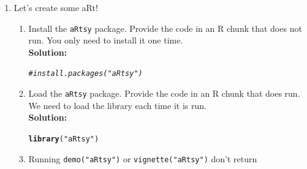 \documentclass{article}\usepackage[]{graphicx}\usepackage[]{xcolor}
\makeatletter
\newcommand{\hlsng}[1]{\textcolor[rgb]{0.192,0.494,0.8}{#1}}%
\newcommand{\hlcom}[1]{\textcolor[rgb]{0.678,0.584,0.686}{\textit{#1}}}%
\newcommand{\hldef}[1]{\textcolor[rgb]{0.345,0.345,0.345}{#1}}%
\newcommand{\hlkwd}[1]{\textcolor[rgb]{0.737,0.353,0.396}{\textbf{#1}}}%
\newenvironment{kframe}{%
 \def\at@end@of@kframe{}%
 \ifinner\ifhmode%
  \def\at@end@of@kframe{\end{minipage}}%
  \begin{minipage}{\columnwidth}%
 \fi\fi%
 \def\FrameCommand##1{\hskip\@totalleftmargin \hskip-\fboxsep
 \colorbox{shadecolor}{##1}\hskip-\fboxsep
     \hskip-\linewidth \hskip-\@totalleftmargin \hskip\columnwidth}%
 \MakeFramed {\advance\hsize-\width
   \@totalleftmargin\z@ \linewidth\hsize
   \@setminipage}}%
 {\par\unskip\endMakeFramed%
 \at@end@of@kframe}
\newenvironment{knitrout}{}{} %
\makeatother
\begin{document}
\begin{enumerate}
\item Let's create some aRt! 
\begin{enumerate}
  \item Install the \texttt{aRtsy} package. Provide the code in an R chunk   that does 
  not run. You only need to install it one time.\\
\textbf{Solution:}
\begin{knitrout}\scriptsize
{}\color{fgcolor}\begin{kframe}
\begin{alltt}
\hlcom{# install.packages("aRtsy")}
\end{alltt}
\end{kframe}
\end{knitrout}
  \item Load the \texttt{aRtsy} package. Provide the code in an R chunk that does run. 
  We need to load the library each time it is run.\\
\textbf{Solution:}
\begin{knitrout}\scriptsize
{}\color{fgcolor}\begin{kframe}
\begin{alltt}
\hlkwd{library}\hldef{(}\hlsng{"aRtsy"}\hldef{)}
\end{alltt}
\end{kframe}
\end{knitrout}
 \item Running \texttt{demo("aRtsy")} or \texttt{vignette("aRtsy")} don't return 

\end{enumerate}
\end{enumerate}
\end{document}
